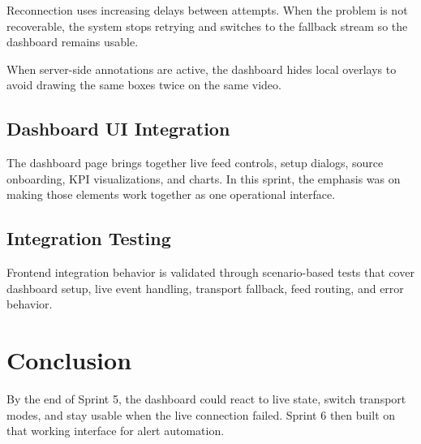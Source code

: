 Reconnection uses increasing delays between attempts. When the problem is not recoverable, the system stops retrying and switches to the fallback stream so the dashboard remains usable.

When server-side annotations are active, the dashboard hides local overlays to avoid drawing the same boxes twice on the same video.

\subsection{Dashboard UI Integration}
The dashboard page brings together live feed controls, setup dialogs, source onboarding, KPI visualizations, and charts. In this sprint, the emphasis was on making those elements work together as one operational interface.

\subsection{Integration Testing}
Frontend integration behavior is validated through scenario-based tests that cover dashboard setup, live event handling, transport fallback, feed routing, and error behavior.

\section{Conclusion}
By the end of Sprint 5, the dashboard could react to live state, switch transport modes, and stay usable when the live connection failed. Sprint 6 then built on that working interface for alert automation.

